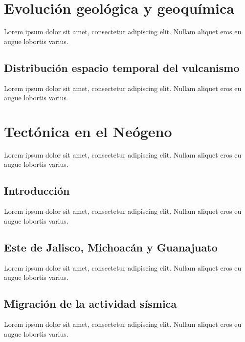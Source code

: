 \documentclass[5p,times,authoryear]{elsarticle}
\begin{document}
\section{Evolución geológica y geoquímica}
    Lorem ipsum dolor sit amet, consectetur adipiscing elit. Nullam aliquet eros eu augue lobortis varius.
    
	\subsection{Distribución espacio temporal del vulcanismo}
        Lorem ipsum dolor sit amet, consectetur adipiscing elit. Nullam aliquet eros eu augue lobortis varius.
        
\section{Tectónica en el Neógeno}
    Lorem ipsum dolor sit amet, consectetur adipiscing elit. Nullam aliquet eros eu augue lobortis varius.
    
	\subsection{Introducción}
        Lorem ipsum dolor sit amet, consectetur adipiscing elit. Nullam aliquet eros eu augue lobortis varius.
        
    \subsection{Este de Jalisco, Michoacán y Guanajuato}
        Lorem ipsum dolor sit amet, consectetur adipiscing elit. Nullam aliquet eros eu augue lobortis varius.
        
    \subsection{Migración de la actividad sísmica}
        Lorem ipsum dolor sit amet, consectetur adipiscing elit. Nullam aliquet eros eu augue lobortis varius.
        
\end{document}
